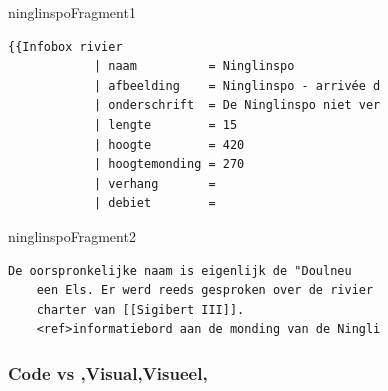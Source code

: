 \begin{saveblock}{ninglinspoFragment1}
    \begin{Verbatim}[tabsize=4,gobble=8]
    {{Infobox rivier
            | naam          = Ninglinspo
            | afbeelding    = Ninglinspo - arrivée d
            | onderschrift  = De Ninglinspo niet ver
            | lengte        = 15
            | hoogte        = 420
            | hoogtemonding = 270
            | verhang       = 
            | debiet        = 
    \end{Verbatim}
\end{saveblock}

\begin{saveblock}{ninglinspoFragment2}
    \begin{Verbatim}[tabsize=4,gobble=8]
    De oorspronkelijke naam is eigenlijk de "Doulneu
    een Els. Er werd reeds gesproken over de rivier
    charter van [[Sigibert III]].
    <ref>informatiebord aan de monding van de Ningli
    \end{Verbatim}
\end{saveblock}

\begin{frame}
    \frametitle{Code vs \lang,Visual,Visueel,}

    \vspace{5pt}

\end{frame}
